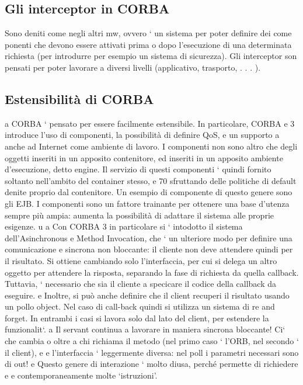 \documentclass[a4paper,12pt]{article}
\begin{document}
\subsection{Gli interceptor in CORBA}
Sono deniti come negli altri mw, ovvero ` un sistema per poter definire dei come
ponenti che devono essere attivati prima o dopo l'esecuzione di una determinata
richiesta (per introdurre per esempio un sistema di sicurezza). Gli interceptor
son pensati per poter lavorare a diversi livelli (applicativo, trasporto, . . . ).
\subsection{Estensibilità di CORBA}
a
CORBA ` pensato per essere facilmente estensibile. In particolare, CORBA
e
3 introduce l'uso di componenti, la possibilità di definire QoS, e un supporto
a
anche ad Internet come ambiente di lavoro.
I componenti non sono altro che degli oggetti inseriti in un apposito contenitore, ed inseriti in un apposito ambiente
d'esecuzione, detto engine. Il servizio
di questi componenti ` quindi fornito soltanto nell'ambito del container stesso,
e
70
sfruttando delle politiche di default denite proprio dal contenitore. Un esempio
di componente di questo genere sono gli EJB.
I componenti sono un fattore trainante per ottenere una base d'utenza sempre più ampia: aumenta la possibilità di
adattare il sistema alle proprie esigenze.
u
a
Con CORBA 3 in particolare si ` intodotto il sistema dell'Asinchronous
e
Method Invocation, che ` un ulteriore modo per definire una comunicazione
e
sincrona non bloccante: il cliente non deve attendere quindi per il risultato.
Si ottiene cambiando solo l'interfaccia, per cui si delega un altro oggetto per
attendere la risposta, separando la fase di richiesta da quella callback. Tuttavia,
` necessario che sia il cliente a specicare il codice della callback da eseguire.
e
Inoltre, si può anche definire che il client recuperi il risultato usando un pollo
object. Nel caso di call-back quindi si utilizza un sistema di re and forget. In
entrambi i casi si lavora solo dal lato del client, per estendere la funzionalit`.
a
Il servant continua a lavorare in maniera sincrona bloccante! Ci` che cambia
o
oltre a chi richiama il metodo (nel primo caso ` l'ORB, nel secondo ` il client),
e
e
l'interfaccia ` leggermente diversa: nel poll i parametri necessari sono di out!
e
Questo genere di interazione ` molto diusa, perché permette di richiedere
e
e
contemporaneamente molte {`}istruzioni'.
\end{document}
